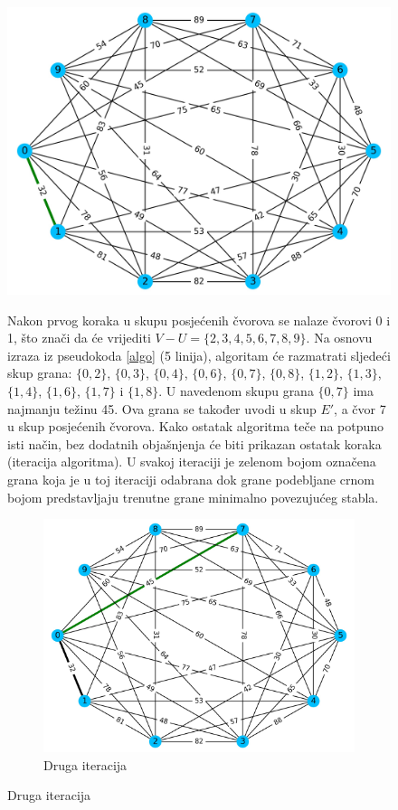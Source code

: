 \documentclass[conference]{IEEEtran}
\begin{document}
\begin{figure}[H]
\begin{center}
\includegraphics[width=1\linewidth]{slike/300dpi/1d.jpg}
\caption{Prva iteracija}
\label{figmat}
\end{center}

Nakon prvog koraka u skupu posjećenih čvorova se nalaze čvorovi 0 i 1, što znači da će vrijediti $V-U = \{2,3,4,5,6,7,8,9\}$. Na osnovu izraza iz pseudokoda \ref{algo} (5 linija), algoritam će razmatrati sljedeći skup grana: $\{0,2\}$, $\{0,3\}$, $\{0,4\}$, $\{0,6\}$, $\{0,7\}$, $\{0,8\}$, $\{1,2\}$, $\{1,3\}$, $\{1,4\}$, $\{1,6\}$, $\{1,7\}$ i $\{1,8\}$. U navedenom skupu grana $\{0,7\}$ ima najmanju težinu 45. Ova grana se također uvodi u skup $E'$, a čvor 7 u skup posjećenih čvorova. Kako ostatak algoritma teče na potpuno isti način, bez dodatnih objašnjenja će biti prikazan ostatak koraka (iteracija algoritma). U svakoj iteraciji je zelenom bojom označena grana koja je u toj iteraciji odabrana dok grane podebljane crnom bojom predstavljaju trenutne grane minimalno povezujućeg stabla.

\begin{figure}[H]
\centering
\includegraphics[width=1\linewidth]{slike/300dpi/2d.jpg}
\caption{Druga iteracija}
\label{figmat}
\end{figure}

\end{figure}
\end{document}
